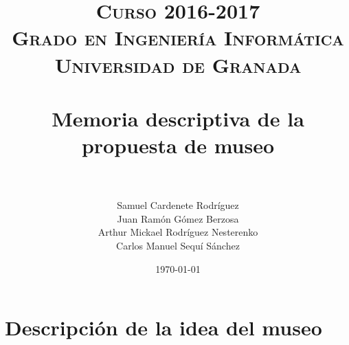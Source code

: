 


\title{	
\normalfont \normalsize 
\textsc{\textbf{Curso 2016-2017} \\ Grado en Ingeniería Informática \\ Universidad de Granada} \\ [25pt] %
\horrule{0.5pt} \\[0.4cm] %
\huge Memoria descriptiva de la propuesta de museo \\ %
\horrule{2pt} \\[0.5cm] %
}

\author{Samuel Cardenete Rodríguez \\
	Juan Ramón Gómez Berzosa\\
	Arthur Mickael Rodríguez Nesterenko\\
	Carlos Manuel Sequí Sánchez} %

\date{\normalsize\today} %




\maketitle %

\newpage %

\tableofcontents %

\newpage

\section{Descripción de la idea del museo}


